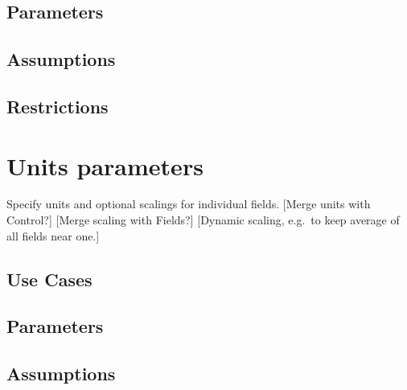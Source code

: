 \documentclass{book}
\begin{document}
\subsection{Parameters}
\subsection{Assumptions}
\subsection{Restrictions}

\section{Units parameters} \label{s:units}

 Specify units and optional scalings for individual
 fields.  [Merge units with Control?] [Merge scaling with Fields?] 
 [Dynamic scaling, e.g.~to keep average of all fields near one.]

\subsection{Use Cases}
\subsection{Parameters}
\subsection{Assumptions}
\end{document}
